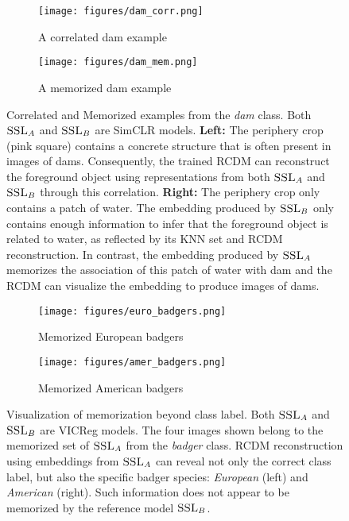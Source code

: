 \begin{figure*}[t!]
     \centering
     \begin{subfigure}[b]{0.49\textwidth}
         \centering
         \texttt{[image: figures/dam\_corr.png]}
         \caption{A {\color{part_blue}correlated} dam example}
         \label{fig:dam correlated}
     \end{subfigure}
     \hfill
     \begin{subfigure}[b]{0.49\textwidth}
         \centering
         \texttt{[image: figures/dam\_mem.png]}
         \caption{A {\color{part_orange}memorized} dam example}
         \label{fig:dam memorized}
     \end{subfigure}
\caption{
Correlated and Memorized examples from the \emph{dam} class. Both $\textsc{SSL}_A$ and $\textsc{SSL}_B$ are SimCLR models.
\textbf{Left:} The periphery crop (pink square) contains a concrete structure that is often present in images of dams. Consequently, the trained RCDM can reconstruct the foreground object using representations from both $\textsc{SSL}_A$ and $\textsc{SSL}_B$ through this correlation.
\textbf{Right:} The periphery crop only contains a patch of water. The embedding produced by $\textsc{SSL}_B$ only contains enough information to infer that the foreground object is related to water, as reflected by its KNN set and RCDM reconstruction. In contrast, the embedding produced by $\textsc{SSL}_A$ memorizes the association of this patch of water with dam and the RCDM can visualize the embedding to produce images of dams.
}
\label{fig:mem v corr dam}
\end{figure*}


\begin{figure}[t!]
     \centering
     \begin{subfigure}[b]{0.49\textwidth}
         \centering
         \texttt{[image: figures/euro\_badgers.png]}
         \caption{{\color{part_orange}Memorized} European badgers}
         \label{fig:euro badgers}
     \end{subfigure}
     \hfill
     \begin{subfigure}[b]{0.49\textwidth}
         \centering
         \texttt{[image: figures/amer\_badgers.png]}
         \caption{{\color{part_orange}Memorized} American badgers}
         \label{fig:amer badgers}
     \end{subfigure}
\caption{
Visualization of \dejavu memorization beyond class label. Both $\textsc{SSL}_A$ and $\textsc{SSL}_B$ are VICReg models. 
The four images shown belong to the memorized set of $\textsc{SSL}_A$ from the \emph{badger} class. RCDM reconstruction using embeddings from $\textsc{SSL}_A$ can reveal not only the correct class label, but also the specific badger species: \emph{European} (left) and \emph{American} (right). Such information does not appear to be memorized by the reference model $\textsc{SSL}_B$.
} 
\label{fig:in class badger}
\end{figure}


